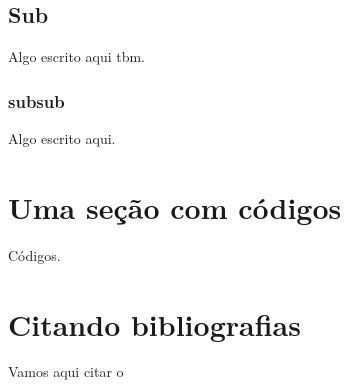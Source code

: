 \documentclass[12pt,twoside,a4paper]{article}
\numberwithin{equation}{section}
\begin{document}
\subsection{Sub}
Algo escrito aqui tbm.
\subsubsection{subsub}
Algo escrito aqui.

\section{Uma seção com códigos}

Códigos.




\section{Citando bibliografias}
Vamos aqui citar o \cite{HIRSCH_VOL2}



\end{document}
